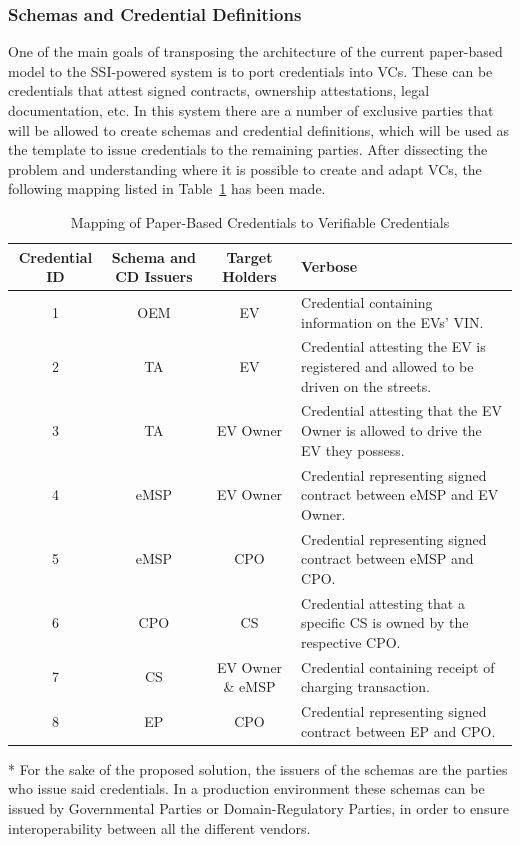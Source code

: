 \subsubsection{Schemas and Credential Definitions}
\label{subsubsec:schemas_and_CDs}

One of the main goals of transposing the architecture of the current paper-based model to the SSI-powered system is to port credentials into VCs. These can be credentials that attest signed contracts, ownership attestations, legal documentation, etc. In this system there are a number of exclusive parties that will be allowed to create schemas and credential definitions, which will be used as the template to issue credentials to the remaining parties. After dissecting the problem and understanding where it is possible to create and adapt VCs, the following mapping listed in Table~\ref{tab:mapping_of_credentials} has been made.

\begin{table}[!htb]
    \begin{tabularx}{\linewidth}{|c|c|c|X|} 
    \hline
    \textbf{Credential ID} & \textbf{Schema and CD Issuers} & \textbf{Target Holders} & \textbf{Verbose} \\
            \hline
            1 & OEM & EV & Credential containing information on the EVs' VIN. \\
            \hline
            2 & TA & EV & Credential attesting the EV is registered and allowed to be driven on the streets. \\
            \hline
            3 & TA& EV Owner & Credential attesting that the EV Owner is allowed to drive the EV they possess. \\
            \hline 
            4 & eMSP & EV Owner & Credential representing signed contract between eMSP and EV Owner. \\
            \hline
            5 & eMSP & CPO & Credential representing signed contract between eMSP and CPO. \\
            \hline
            6 & CPO & CS & Credential attesting that a specific CS is owned by the respective CPO. \\
            \hline
            7 & CS & EV Owner \& eMSP & Credential containing receipt of charging transaction. \\
            \hline
            8 & EP & CPO & Credential representing signed contract between EP and CPO. \\
            \hline
    \end{tabularx}
    * For the sake of the proposed solution, the issuers of the schemas are the parties who issue said credentials. In a production environment these schemas can be issued by Governmental Parties or Domain-Regulatory Parties, in order to ensure interoperability between all the different vendors.
    \caption{Mapping of Paper-Based Credentials to Verifiable Credentials}
    \label{tab:mapping_of_credentials}
\end{table}

